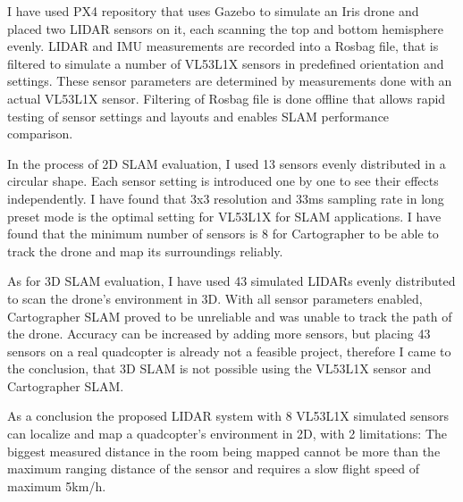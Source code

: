 I have used PX4 repository that uses Gazebo to simulate an Iris drone and placed two LIDAR sensors on it,
each scanning the top and bottom hemisphere evenly. LIDAR and IMU measurements are recorded into a Rosbag file,
that is filtered to simulate a number of  VL53L1X sensors in predefined orientation and settings. 
These sensor parameters are determined by measurements done with an actual VL53L1X sensor.
Filtering of Rosbag file is done offline that allows rapid testing of sensor settings and layouts and 
enables SLAM performance comparison.

In the process of 2D SLAM evaluation, I used 13 sensors evenly distributed in a circular shape. Each sensor setting
is introduced one by one to see their effects independently. I have found that 3x3 resolution and
33ms sampling rate in long preset mode is the optimal setting for VL53L1X for SLAM applications. I have found
that the minimum number of sensors is 8 for Cartographer to be able to track the drone and map its surroundings 
reliably.

As for 3D SLAM evaluation, I have used 43 simulated LIDARs evenly distributed to scan the drone's environment 
in 3D. With all sensor parameters enabled, Cartographer SLAM proved to be unreliable and was unable to track
the path of the drone. Accuracy can be increased by adding more sensors, but placing 43 sensors on a real
quadcopter is already not a feasible project, therefore I came  to the conclusion, that 3D SLAM is not possible
using the VL53L1X sensor and Cartographer SLAM.


As a conclusion the proposed LIDAR system with 8 VL53L1X simulated sensors can localize and map a 
quadcopter's environment in 2D, with 2 limitations: The biggest measured distance in the room being mapped 
cannot be more than the maximum ranging distance of the sensor and requires a slow flight speed of maximum 
5km/h. 






\vfill
\selectthesislanguage

\setcounter{romanPage}{\value{page}}
